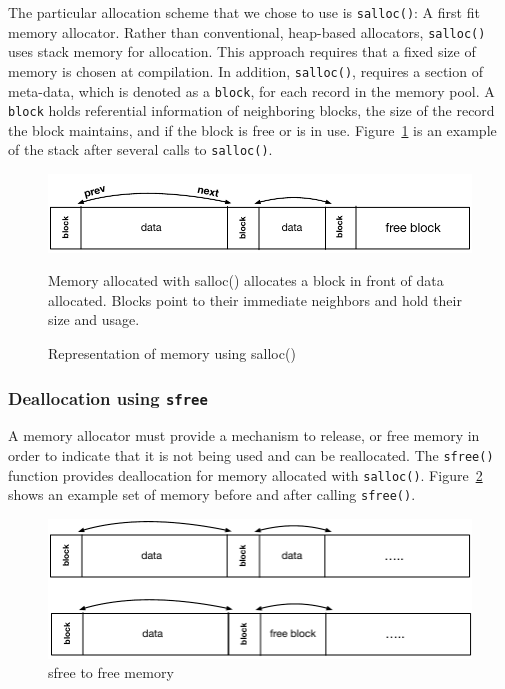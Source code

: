 The particular allocation scheme that we chose to use is \texttt{salloc()}: A first fit memory allocator. Rather than conventional, heap-based allocators, \texttt{salloc()} uses stack memory for allocation. This approach requires that a fixed size of memory is chosen at compilation. In addition, \texttt{salloc()}, requires a section of meta-data, which is denoted as a \texttt{block}, for each record in the memory pool. A \texttt{block} holds referential information of neighboring blocks, the size of the record the block maintains, and if the block is free or is in use. Figure~\ref{fig:stack} is an example of the stack after several calls to \texttt{salloc()}.

\begin{figure}[!htb]
\includegraphics[scale=.55]{figs/stack.pdf}
\caption{Representation of memory using salloc()}
Memory allocated with salloc() allocates a block in front of data allocated. Blocks point to their immediate neighbors and hold their size and usage.
\label{fig:stack}
\end{figure}

\subsubsection{Deallocation using \texttt{sfree}}

A memory allocator must provide a mechanism to release, or free memory in order to indicate that it is not being used and can be reallocated. The \texttt{sfree()} function provides deallocation for memory allocated with \texttt{salloc()}. Figure~\ref{fig:free} shows an example set of memory before and after calling \texttt{sfree()}. 

\begin{figure}[!htb]
\includegraphics[scale=.55]{figs/sfree.pdf}
\caption{sfree to free memory}
\label{fig:free}
\end{figure}

